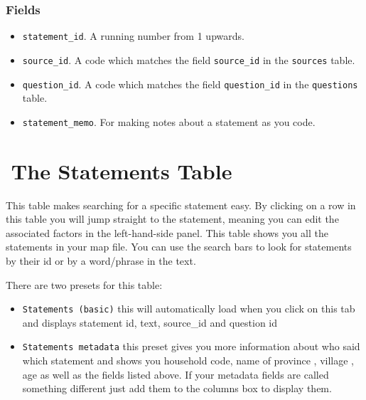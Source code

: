 \documentclass[
]{book}
\providecommand{\tightlist}{%
  \setlength{\itemsep}{0pt}\setlength{\parskip}{0pt}}
\begin{document}
\hypertarget{fields-3}{%
\subsection{Fields}\label{fields-3}}

\begin{itemize}
\tightlist
\item
  \texttt{statement\_id}. A running number from 1 upwards.
\item
  \texttt{source\_id}. A code which matches the field \texttt{source\_id} in the \texttt{sources} table.
\item
  \texttt{question\_id}. A code which matches the field \texttt{question\_id} in the \texttt{questions} table.
\item
  \texttt{statement\_memo}. For making notes about a statement as you code.
\end{itemize}

\hypertarget{xthe-statements-table}{%
\chapter{🧪The Statements Table}\label{xthe-statements-table}}

This table makes searching for a specific statement easy. By clicking on a row in this table you will jump straight to the statement, meaning you can edit the associated factors in the left-hand-side panel. This table shows you all the statements in your map file. You can use the search bars to look for statements by their id or by a word/phrase in the text.

There are two presets for this table:

\begin{itemize}
\item
  \texttt{Statements\ (basic)} this will automatically load when you click on this tab and displays statement id, text, source\_id and question id
\item
  \texttt{Statements\ metadata} this preset gives you more information about who said which statement and shows you household code, name of province , village , age as well as the fields listed above. If your metadata fields are called something different just add them to the columns box to display them.
\end{itemize}
\end{document}
